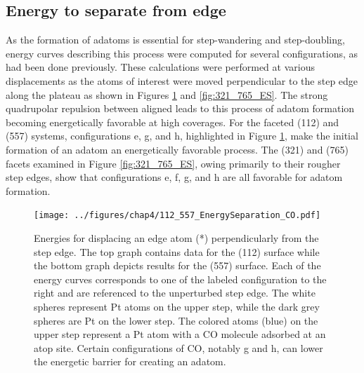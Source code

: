 \subsection{Energy to separate from edge}
As the formation of adatoms is essential for step-wandering and step-doubling,
energy curves describing this process were computed for several 
configurations, as had been done previously.  \citep{Michalka:2013aa,
Michalka:2015aa} These calculations were performed at various displacements as
the atoms of interest were moved perpendicular to the step edge along the
plateau as shown in Figures \ref{fig:112_557_ES} and \ref{fig:321_765_ES}. The
strong quadrupolar repulsion between aligned  leads to this process of
adatom formation becoming energetically favorable at high coverages. For the
faceted (112) and (557) systems, configurations e, g, and h, highlighted in
Figure \ref{fig:112_557_ES}, make the initial formation of an adatom an
energetically favorable process. The (321) and (765) facets examined in Figure
\ref{fig:321_765_ES}, owing primarily to their rougher step edges, show that
configurations e, f, g, and h are all favorable for adatom formation.

\begin{landscape}
\begin{figure}[p!]
  \centering
  \texttt{[image: ../figures/chap4/112\_557\_EnergySeparation\_CO.pdf]}
  \caption{Energies for displacing an edge atom (*) perpendicularly from the
step edge. The top graph contains data for the (112) surface while the bottom
graph depicts results for the (557) surface.  Each of the energy curves
corresponds to one of the labeled configuration to the right and are referenced
to the unperturbed step edge. The white spheres represent Pt atoms on the upper
step, while the dark grey spheres are Pt on the lower step.  The colored atoms
(blue) on the upper step represent a Pt atom with a CO molecule adsorbed at an
atop site. Certain configurations of CO, notably g and h, can lower the
energetic barrier for creating an adatom.}
\label{fig:112_557_ES}
\end{figure}
\end{landscape}


